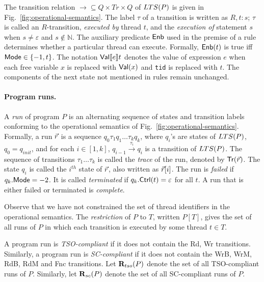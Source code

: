 The transition relation $\rightarrow\subseteq Q\times Tr\times Q$ of $\mathnormal{LTS}(P)$ is given in Fig.~\ref{fig:operational-semantics}.
The label $\tau$ of a transition is written as $R,t:s$; $\tau$ is called an $R$-transition, {\em executed by} thread $t$, and the {\em execution of} statement $s$ when $s\neq\varepsilon$ and $s\notin\mathbb{N}$.
The auxiliary predicate $\mathsf{Enb}$ used in the premise of a rule determines whether a particular thread can execute.
Formally, $\mathsf{Enb}(t)$ is true iff $\mathsf{Mode}\in\{-1,t\}$. 
The notation $\mathsf{Val} \llbracket e \rrbracket t$ denotes the value of expression $e$ when each free variable $x$ is replaced with $\mathsf{Val}(x)$ and {\tt tid} is replaced with $t$.
The components of the next state not mentioned in rules remain unchanged.


\paragraph{Program runs.}
A {\em run} of program $P$ is an alternating sequence of states and transition labels conforming to the operational semantics of Fig.~\ref{fig:operational-semantics}.
Formally, a run $\vec{r}$ is a sequence $q_0\tau_1q_1\ldots \tau_kq_k$, where $q_i$'s are states of $\mathnormal{LTS}(P)$, $q_0=q_{init}$, and for each $i\in[1,k]$, $q_{i-1}\xrightarrow{\tau_i}q_i$ is a transition of $\mathnormal{LTS}(P)$.
The sequence of transitions $\tau_1\ldots \tau_k$ is called the {\em trace} of the run, denoted by $\mathsf{Tr}(\vec{r})$.
The state $q_i$ is called the $i^{th}$ state of $\vec{r}$, also written as $\vec{r}[i]$.
The run is {\em failed} if $q_k.\mathsf{Mode}=-2$.
It is called {\em terminated} if $q_k.\mathsf{Ctrl}(t)=\varepsilon$ for all $t$.
A run that is either failed or terminated is {\em complete}.

Observe that we have not constrained the set of thread identifiers in the operational semantics.
The {\em restriction} of $P$ to $T$, written $P[T]$, gives the set of all runs of $P$ in which each transition is executed by some thread $t\in T$. 

A program run is {\em TSO-compliant} if it does not contain the {\sc \small Rd, Wr} transitions.
Similarly, a program run is {\em SC-compliant} if it does not contain the {\sc \small WrB, WrM, RdB, RdM} and {\sc \small Fnc} transitions.
Let $\mathbf{R}_{tso}(P)$ denote the set of all TSO-compliant runs of $P$.
Similarly, let $\mathbf{R}_{sc}(P)$ denote the set of all SC-compliant runs of $P$.


